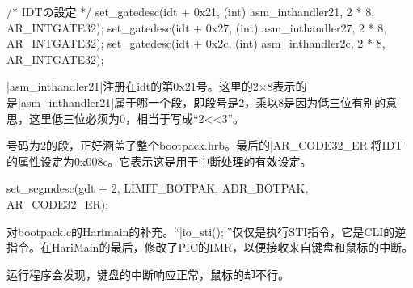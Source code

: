 \begin{code}
    /* IDTの設定 */
	set_gatedesc(idt + 0x21, (int) asm_inthandler21, 2 * 8, AR_INTGATE32);
	set_gatedesc(idt + 0x27, (int) asm_inthandler27, 2 * 8, AR_INTGATE32);
	set_gatedesc(idt + 0x2c, (int) asm_inthandler2c, 2 * 8, AR_INTGATE32);
\end{code}
|asm_inthandler21|注册在idt的第0x21号。这里的2$\times$8表示的是|asm_inthandler21|属于哪一个段，即段号是2，乘以8是因为低三位有别的意思，这里低三位必须为0，相当于写成“2<<3”。

号码为2的段，正好涵盖了整个bootpack.hrb。最后的|AR_CODE32_ER|将IDT的属性设定为0x008e。它表示这是用于中断处理的有效设定。
\begin{code}
set_segmdesc(gdt + 2, LIMIT_BOTPAK, ADR_BOTPAK, AR_CODE32_ER);
\end{code}

\cs

对bootpack.c的Harimain的补充。“|io_sti();|”仅仅是执行STI指令，它是CLI的逆指令。在HariMain的最后，修改了PIC的IMR，以便接收来自键盘和鼠标的中断。

\cs

运行程序会发现，键盘的中断响应正常，鼠标的却不行。










